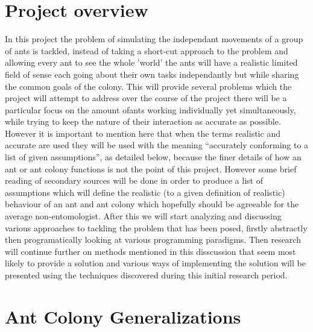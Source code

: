 \documentclass{report}
\begin{document}
\section{Project overview}
In this project the problem of simulating the independant movements of a group of ants is tackled, instead of taking a short-cut approach to the problem and allowing every ant to see the whole 'world' the ants will have a realistic limited field of sense each going about their own tasks independantly but while sharing the common goals of the colony. This will provide several problems which the project will attempt to address over the course of the project there will be a particular focus on the amount ofants working individually yet simultaneously, while trying to keep the nature of their interaction as accurate as possible. However it is important to mention here that when  the terms realistic and accurate are used they will be used with the meaning ``accurately conforming to a list of given assumptions'', as detailed below, because the finer details of how an ant or ant colony functions is not the point of this project. However some brief reading of secondary sources will be done in order to produce a list of assumptions which will define the realistic (to a given definition of realistic) behaviour of an ant and ant colony which hopefully should be agreeable for the average non-entomologist. After this we will start analyzing and discussing various approaches to tackling the problem that has been posed, firstly abstractly then programatically looking at various programming paradigms. Then research will continue further on methods mentioned in this disscussion that seem most likely to provide a solution and various ways of implementing the solution will be presented using the techniques discovered during this initial research period. 

\section{Ant Colony Generalizations}
\end{document}
